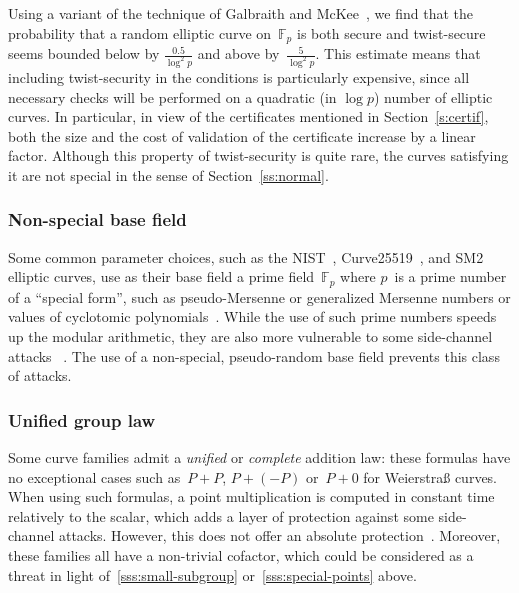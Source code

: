 \documentclass[twocolumn,letterpaper,10pt]{article}
\def\F{\mathbb{F}}
\begin{document}
Using a variant of the technique of Galbraith and McKee~\cite{lms2000gm},
we find that the probability that a random elliptic curve on~$\F_p$
is both secure and twist-secure
seems bounded below by $\frac{0.5}{\log^2 p}$
and above by~$\frac{5}{\log^2 p}$.
This estimate means that
including twist-security in the conditions is particularly expensive,
since all necessary checks will be performed on
a quadratic (in $\log p$) number of elliptic curves.
In particular, in view of
the certificates mentioned in Section~\ref{s:certif},
both the size and the cost of validation of the certificate
increase by a linear factor.
Although this property of twist-security is quite rare,
the curves satisfying it are not special
in the sense of Section~\ref{ss:normal}.

\subsubsection{Non-special base field}
\label{sss:special-side}

Some common parameter choices,
such as the NIST~\cite{nist2000fips186-2},
Curve25519~\cite{pkc2006bernstein},
and SM2~\cite{oscca2010sm2} elliptic curves,
use as their base field a prime field~$\F_p$
where $p$~is a prime number of a ``special form'',
such as pseudo-Mersenne or generalized Mersenne numbers
or values of cyclotomic polynomials~\cite{mc2013gm}.
While the use of such prime numbers speeds up the modular arithmetic,
they are also more vulnerable to some side-channel attacks%
~\cite{ches2005dkj,ics2005ss,ches2014bpsy,eprint2014psy,ieice2006ss,indo2014frv}.
The use of a non-special, pseudo-random base field
prevents this class of attacks.

\subsubsection{Unified group law}
\label{sss:unified}

Some curve families admit a \emph{unified} or \emph{complete}
addition law: these formulas have no exceptional cases
such as~$P + P$, $P + (-P)$ or~$P + 0$ for Weierstraß curves.
When using such formulas, a point multiplication
is computed in constant time relatively to the scalar,
which adds a layer of protection against some side-channel attacks.
However, this does not offer an absolute protection~\cite{indo2014frv}.
Moreover, these families all have a non-trivial cofactor,
which could be considered as a threat
in light of~\ref{sss:small-subgroup} or~\ref{sss:special-points} above.
\end{document}
